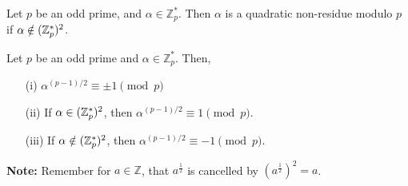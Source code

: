 \newpage


\begin{Def}
    
    Let $p$ be an odd prime, and $\alpha\in\mathbb{Z}_p^*$. Then $\alpha$ is a quadratic non-residue modulo $p$ if $\alpha\notin(\mathbb{Z}_p^*)^2$.\\
\end{Def}

\begin{theo}

    Let $p$ be an odd prime and $\alpha\in\mathbb{Z}_p^*$. Then,
    \begin{enumerate}
        \item[(i)] $\alpha^{(p-1)/2} \equiv \pm1 \pmod{p}$
        \item[(ii)] If $\alpha\in(\mathbb{Z}_p^*)^2$, then $\alpha^{(p-1)/2}\equiv 1\pmod{p}$.
        \item[(iii)] If $\alpha\notin(\mathbb{Z}_p^*)^2$, then $\alpha^{(p-1)/2}\equiv -1\pmod{p}$.
    \end{enumerate}
\end{theo}

\begin{Note}
    \textbf{Note:} Remember for $a\in\mathbb{Z}$, that $a^\frac{1}{2}$ is cancelled by $(a^\frac{1}{2})^2=a$.
\end{Note}


